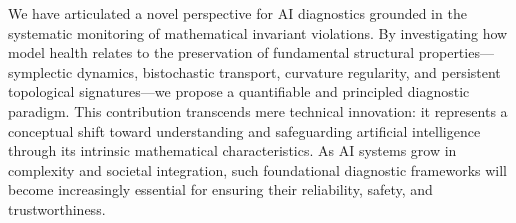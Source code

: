 \documentclass[11pt]{article}
\begin{document}
We have articulated a novel perspective for AI diagnostics grounded in the systematic monitoring of mathematical invariant violations. By investigating how model health relates to the preservation of fundamental structural properties---symplectic dynamics, bistochastic transport, curvature regularity, and persistent topological signatures---we propose a quantifiable and principled diagnostic paradigm. This contribution transcends mere technical innovation: it represents a conceptual shift toward understanding and safeguarding artificial intelligence through its intrinsic mathematical characteristics. As AI systems grow in complexity and societal integration, such foundational diagnostic frameworks will become increasingly essential for ensuring their reliability, safety, and trustworthiness.



\end{document}
